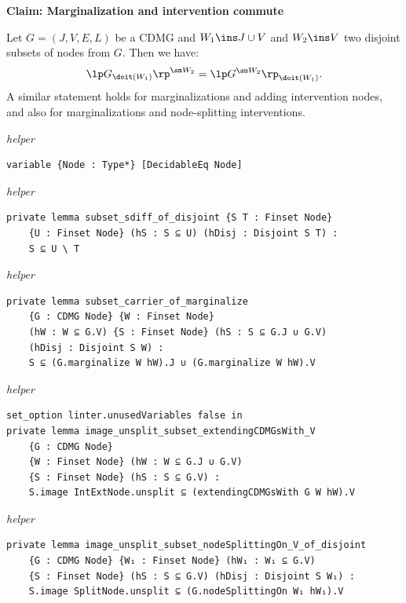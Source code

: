 \vspace{\appendixNotesGap}

\noindent\textbf{Claim: Marginalization and intervention commute}\par\smallskip
{\appendixTexSize
      Let $G=(J,V,E,L)$ be a CDMG and $W_1 \ins J \cup V$ and $W_2 \ins V$ two disjoint subsets of nodes from $G$.
      Then we have:
      \[ \lp G_{\doit(W_1)} \rp^{\sm W_2} = \lp G^{\sm W_2} \rp_{\doit(W_1)}. \]
      A similar statement holds for marginalizations and adding intervention nodes, and also for marginalizations and node-splitting interventions.
\par}
\smallskip
{\small\textit{helper}}
\begin{verbatim}
variable {Node : Type*} [DecidableEq Node]
\end{verbatim}
{\small\textit{helper}}
\begin{verbatim}
private lemma subset_sdiff_of_disjoint {S T : Finset Node}
    {U : Finset Node} (hS : S ⊆ U) (hDisj : Disjoint S T) :
    S ⊆ U \ T
\end{verbatim}
{\small\textit{helper}}
\begin{verbatim}
private lemma subset_carrier_of_marginalize
    {G : CDMG Node} {W : Finset Node}
    (hW : W ⊆ G.V) {S : Finset Node} (hS : S ⊆ G.J ∪ G.V)
    (hDisj : Disjoint S W) :
    S ⊆ (G.marginalize W hW).J ∪ (G.marginalize W hW).V
\end{verbatim}
{\small\textit{helper}}
\begin{verbatim}
set_option linter.unusedVariables false in
private lemma image_unsplit_subset_extendingCDMGsWith_V
    {G : CDMG Node}
    {W : Finset Node} (hW : W ⊆ G.J ∪ G.V)
    {S : Finset Node} (hS : S ⊆ G.V) :
    S.image IntExtNode.unsplit ⊆ (extendingCDMGsWith G W hW).V
\end{verbatim}
{\small\textit{helper}}
\begin{verbatim}
private lemma image_unsplit_subset_nodeSplittingOn_V_of_disjoint
    {G : CDMG Node} {W₁ : Finset Node} (hW₁ : W₁ ⊆ G.V)
    {S : Finset Node} (hS : S ⊆ G.V) (hDisj : Disjoint S W₁) :
    S.image SplitNode.unsplit ⊆ (G.nodeSplittingOn W₁ hW₁).V
\end{verbatim}
